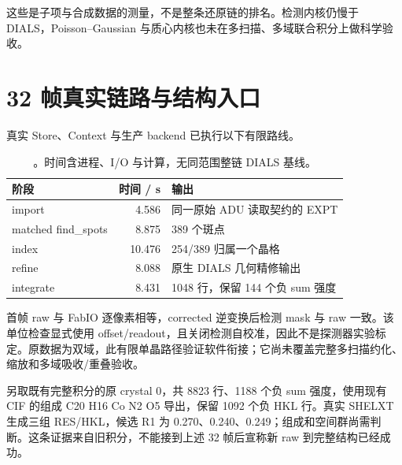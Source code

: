 这些是子项与合成数据的测量，不是整条还原链的排名。检测内核仍慢于 DIALS，Poisson--Gaussian 与质心内核也未在多扫描、多域联合积分上做科学验收。

\section{32 帧真实链路与结构入口}
真实 Store、Context 与生产 backend 已执行以下有限路线。
\begin{table}[htbp]\centering\small
\begin{tabularx}{\textwidth}{l r X}
\toprule 阶段 & 时间 / s & 输出\\\midrule
import & 4.586 & 同一原始 ADU 读取契约的 EXPT\\
matched find\_spots & 8.875 & 389 个斑点\\
index & 10.476 & 254/389 归属一个晶格\\
refine & 8.088 & 原生 DIALS 几何精修输出\\
integrate & 8.431 & 1048 行，保留 144 个负 sum 强度\\
\bottomrule
\end{tabularx}
\caption{。时间含进程、I/O 与计算，无同范围整链 DIALS 基线。}
\end{table}
首帧 raw 与 FabIO 逐像素相等，corrected 逆变换后检测 mask 与 raw 一致。该单位检查显式使用 offset/readout，且关闭检测自校准，因此不是探测器实验标定。原数据为双域，此有限单晶路径验证软件衔接；它尚未覆盖完整多扫描约化、缩放和多域吸收/重叠验收。

另取既有完整积分的原 crystal 0，共 8823 行、1188 个负 sum 强度，使用现有 CIF 的组成 C20 H16 Co N2 O5 导出，保留 1092 个负 HKL 行。真实 SHELXT 生成三组 RES/HKL，候选 R1 为 0.270、0.240、0.249；组成和空间群尚需判断。这条证据来自旧积分，不能接到上述 32 帧后宣称新 raw 到完整结构已经成功。
